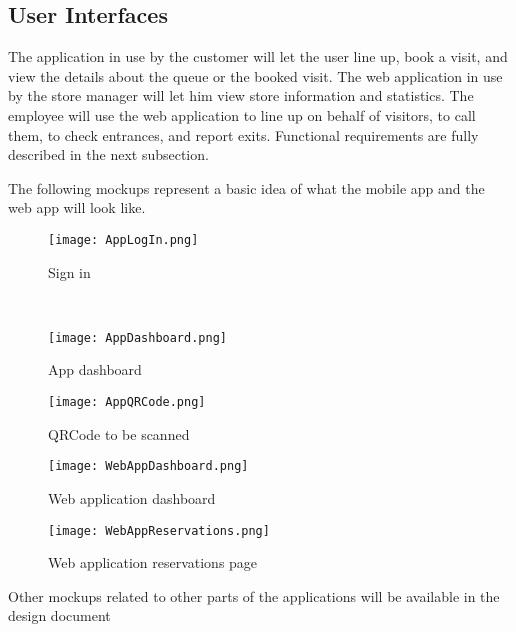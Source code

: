 \subsection{User Interfaces}
The application in use by the customer will let the user line up, book a visit, and view the details about the queue or the booked visit.
The web application in use by the store manager will let him view store information and statistics. The employee will use the web application to line up on behalf of visitors, to call them, to check entrances, and report exits. Functional requirements are fully described in the next subsection. 

The following mockups represent a basic idea of what the mobile app and the web app will look like.

\begin{figure}[H]
    \begin{minipage}[b]{8cm}
    \centering
    \texttt{[image: AppLogIn.png]}
    \caption{Sign in}
    \end{minipage}
    \ \hspace{2mm} \hspace{3mm} \
    \begin{minipage}[b]{8cm}
    \centering
    \texttt{[image: AppDashboard.png]}
    \caption{App dashboard}
    \end{minipage}
\end{figure}

\begin{figure}[H]
    \centering
    \texttt{[image: AppQRCode.png]}
    \caption{QRCode to be scanned}
\end{figure}

\begin{figure}[H]
    \centering
    \texttt{[image: WebAppDashboard.png]}
    \caption{Web application dashboard}
\end{figure}

\begin{figure}[H]
    \centering
    \texttt{[image: WebAppReservations.png]}
    \caption{Web application reservations page}
\end{figure}
Other mockups related to other parts of the applications will be available in the design document

